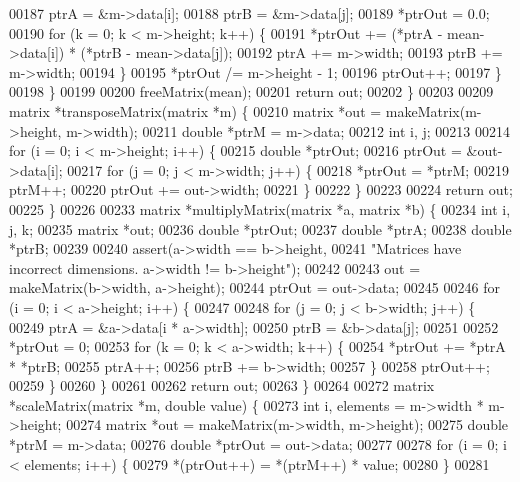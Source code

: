 \begin{DoxyCode}
{{00187       ptrA = &m->data[i];
00188       ptrB = &m->data[j];
00189       *ptrOut = 0.0;
00190       \textcolor{keywordflow}{for} (k = 0; k < m->height; k++) \{
00191         *ptrOut += (*ptrA - mean->data[i]) * (*ptrB - mean->data[j]);
00192         ptrA += m->width;
00193         ptrB += m->width;
00194       \}
00195       *ptrOut /= m->height - 1;
00196       ptrOut++;
00197     \}
00198   \}
00199 
00200   freeMatrix(mean);
00201   \textcolor{keywordflow}{return} out;
00202 \}
00203 
00209 matrix *transposeMatrix(matrix *m) \{
00210   matrix *out = makeMatrix(m->height, m->width);
00211   \textcolor{keywordtype}{double} *ptrM = m->data;
00212   \textcolor{keywordtype}{int} i, j;
00213 
00214   \textcolor{keywordflow}{for} (i = 0; i < m->height; i++) \{
00215     \textcolor{keywordtype}{double} *ptrOut;
00216     ptrOut = &out->data[i];
00217     \textcolor{keywordflow}{for} (j = 0; j < m->width; j++) \{
00218       *ptrOut = *ptrM;
00219       ptrM++;
00220       ptrOut += out->width;
00221     \}
00222   \}
00223 
00224   \textcolor{keywordflow}{return} out;
00225 \}
00226 
00233 matrix *multiplyMatrix(matrix *a, matrix *b) \{
00234   \textcolor{keywordtype}{int} i, j, k;
00235   matrix *out;
00236   \textcolor{keywordtype}{double} *ptrOut;
00237   \textcolor{keywordtype}{double} *ptrA;
00238   \textcolor{keywordtype}{double} *ptrB;
00239 
00240   assert(a->width == b->height,
00241          \textcolor{stringliteral}{"Matrices have incorrect dimensions. a->width != b->height"});
00242 
00243   out = makeMatrix(b->width, a->height);
00244   ptrOut = out->data;
00245 
00246   \textcolor{keywordflow}{for} (i = 0; i < a->height; i++) \{
00247 
00248     \textcolor{keywordflow}{for} (j = 0; j < b->width; j++) \{
00249       ptrA = &a->data[i * a->width];
00250       ptrB = &b->data[j];
00251 
00252       *ptrOut = 0;
00253       \textcolor{keywordflow}{for} (k = 0; k < a->width; k++) \{
00254         *ptrOut += *ptrA * *ptrB;
00255         ptrA++;
00256         ptrB += b->width;
00257       \}
00258       ptrOut++;
00259     \}
00260   \}
00261 
00262   \textcolor{keywordflow}{return} out;
00263 \}
00264 
00272 matrix *scaleMatrix(matrix *m, \textcolor{keywordtype}{double} value) \{
00273   \textcolor{keywordtype}{int} i, elements = m->width * m->height;
00274   matrix *out = makeMatrix(m->width, m->height);
00275   \textcolor{keywordtype}{double} *ptrM = m->data;
00276   \textcolor{keywordtype}{double} *ptrOut = out->data;
00277 
00278   \textcolor{keywordflow}{for} (i = 0; i < elements; i++) \{
00279     *(ptrOut++) = *(ptrM++) * value;
00280   \}
00281 
}}
\end{DoxyCode}

